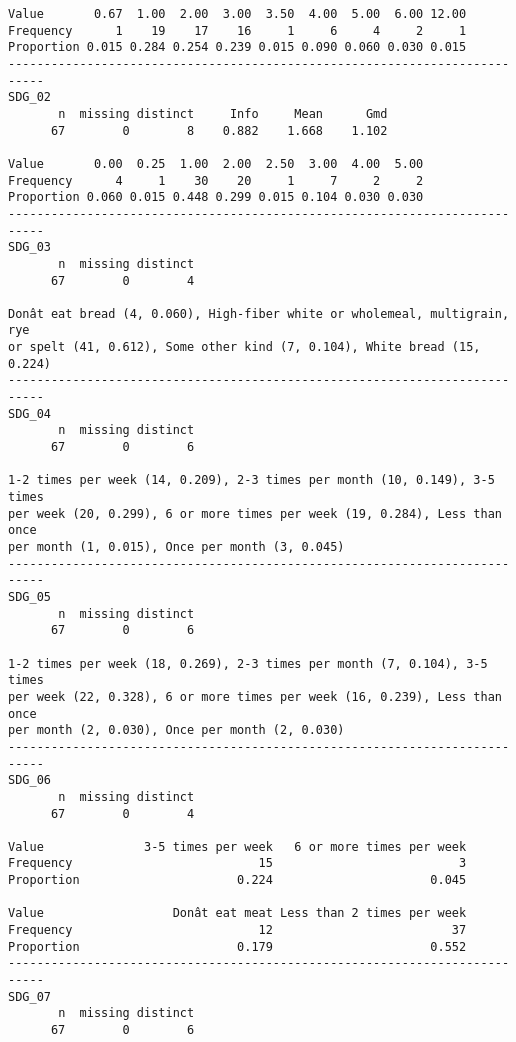 \documentclass[]{article}
\begin{document}
\begin{verbatim}
Value       0.67  1.00  2.00  3.00  3.50  4.00  5.00  6.00 12.00
Frequency      1    19    17    16     1     6     4     2     1
Proportion 0.015 0.284 0.254 0.239 0.015 0.090 0.060 0.030 0.015
---------------------------------------------------------------------------
SDG_02 
       n  missing distinct     Info     Mean      Gmd 
      67        0        8    0.882    1.668    1.102 
                                                          
Value       0.00  0.25  1.00  2.00  2.50  3.00  4.00  5.00
Frequency      4     1    30    20     1     7     2     2
Proportion 0.060 0.015 0.448 0.299 0.015 0.104 0.030 0.030
---------------------------------------------------------------------------
SDG_03 
       n  missing distinct 
      67        0        4 

Donât eat bread (4, 0.060), High-fiber white or wholemeal, multigrain, rye
or spelt (41, 0.612), Some other kind (7, 0.104), White bread (15, 0.224)
---------------------------------------------------------------------------
SDG_04 
       n  missing distinct 
      67        0        6 

1-2 times per week (14, 0.209), 2-3 times per month (10, 0.149), 3-5 times
per week (20, 0.299), 6 or more times per week (19, 0.284), Less than once
per month (1, 0.015), Once per month (3, 0.045)
---------------------------------------------------------------------------
SDG_05 
       n  missing distinct 
      67        0        6 

1-2 times per week (18, 0.269), 2-3 times per month (7, 0.104), 3-5 times
per week (22, 0.328), 6 or more times per week (16, 0.239), Less than once
per month (2, 0.030), Once per month (2, 0.030)
---------------------------------------------------------------------------
SDG_06 
       n  missing distinct 
      67        0        4 
                                                                
Value              3-5 times per week   6 or more times per week
Frequency                          15                          3
Proportion                      0.224                      0.045
                                                                
Value                  Donât eat meat Less than 2 times per week
Frequency                          12                         37
Proportion                      0.179                      0.552
---------------------------------------------------------------------------
SDG_07 
       n  missing distinct 
      67        0        6 


\end{verbatim}
\end{document}
